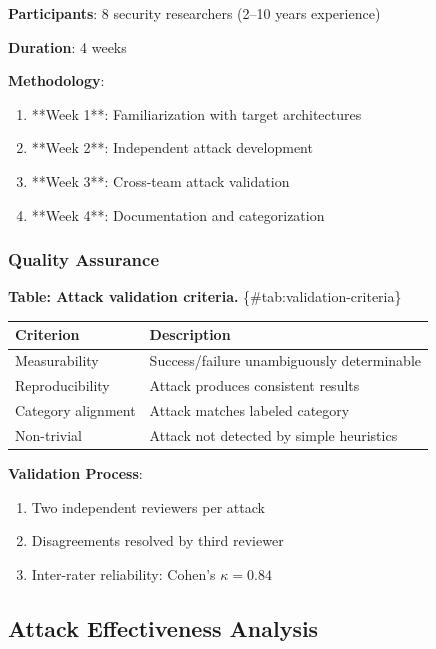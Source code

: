 \documentclass[
]{article}
\newcounter{none} %
\begin{document}
\textbf{Participants}: 8 security researchers (2--10 years experience)

\textbf{Duration}: 4 weeks

\textbf{Methodology}:

\begin{enumerate}
\item **Week 1**: Familiarization with target architectures
\item **Week 2**: Independent attack development
\item **Week 3**: Cross-team attack validation
\item **Week 4**: Documentation and categorization
\end{enumerate}

\subsubsection{Quality Assurance}\label{sec:qa}

\textbf{Table: Attack validation criteria.}
\{\#tab:validation-criteria\}

{\def\LTcaptype{none} %
\begin{longtable}[]{@{}ll@{}}
\toprule\noalign{}
Criterion & Description \\
\midrule\noalign{}
\endhead
\bottomrule\noalign{}
\endlastfoot
Measurability & Success/failure unambiguously determinable \\
Reproducibility & Attack produces consistent results \\
Category alignment & Attack matches labeled category \\
Non-trivial & Attack not detected by simple heuristics \\
\end{longtable}
}

\textbf{Validation Process}:

\begin{enumerate}
\item Two independent reviewers per attack
\item Disagreements resolved by third reviewer
\item Inter-rater reliability: Cohen's $\kappa = 0.84$
\end{enumerate}

\subsection{Attack Effectiveness
Analysis}\label{sec:effectiveness-analysis}
\end{document}

